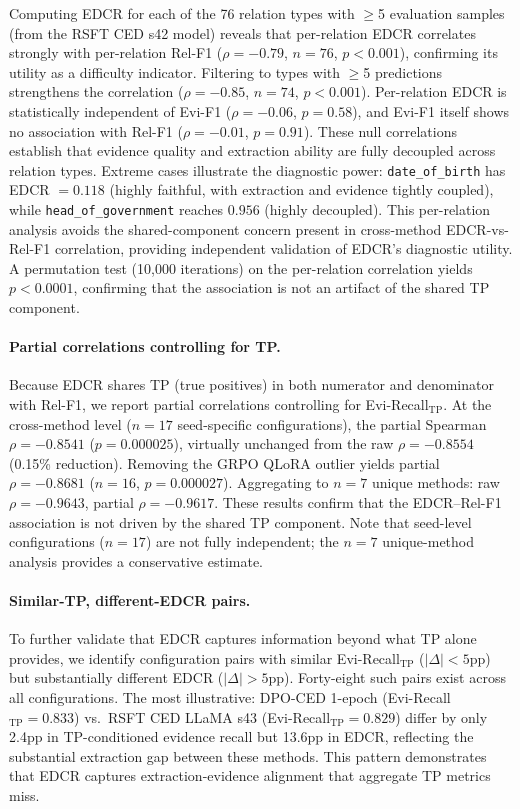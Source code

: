 Computing EDCR for each of the 76 relation types with $\geq$5 evaluation samples (from the RSFT CED s42 model) reveals that per-relation EDCR correlates strongly with per-relation Rel-F1 ($\rho = -0.79$, $n = 76$, $p < 0.001$), confirming its utility as a difficulty indicator. Filtering to types with $\geq$5 predictions strengthens the correlation ($\rho = -0.85$, $n = 74$, $p < 0.001$). Per-relation EDCR is statistically independent of Evi-F1 ($\rho = -0.06$, $p = 0.58$), and Evi-F1 itself shows no association with Rel-F1 ($\rho = -0.01$, $p = 0.91$). These null correlations establish that evidence quality and extraction ability are fully decoupled across relation types. Extreme cases illustrate the diagnostic power: \texttt{date\_of\_birth} has EDCR $= 0.118$ (highly faithful, with extraction and evidence tightly coupled), while \texttt{head\_of\_government} reaches $0.956$ (highly decoupled). This per-relation analysis avoids the shared-component concern present in cross-method EDCR-vs-Rel-F1 correlation, providing independent validation of EDCR's diagnostic utility. A permutation test (10,000 iterations) on the per-relation correlation yields $p < 0.0001$, confirming that the association is not an artifact of the shared TP component.

\paragraph{Partial correlations controlling for TP.}
Because EDCR shares TP (true positives) in both numerator and denominator with Rel-F1, we report partial correlations controlling for Evi-Recall$_\text{TP}$. At the cross-method level ($n = 17$ seed-specific configurations), the partial Spearman $\rho = -0.8541$ ($p = 0.000025$), virtually unchanged from the raw $\rho = -0.8554$ (0.15\% reduction). Removing the GRPO QLoRA outlier yields partial $\rho = -0.8681$ ($n = 16$, $p = 0.000027$). Aggregating to $n = 7$ unique methods: raw $\rho = -0.9643$, partial $\rho = -0.9617$. These results confirm that the EDCR--Rel-F1 association is not driven by the shared TP component. Note that seed-level configurations ($n = 17$) are not fully independent; the $n = 7$ unique-method analysis provides a conservative estimate.

\paragraph{Similar-TP, different-EDCR pairs.}
To further validate that EDCR captures information beyond what TP alone provides, we identify configuration pairs with similar Evi-Recall$_\text{TP}$ ($|\Delta| < 5$pp) but substantially different EDCR ($|\Delta| > 5$pp). Forty-eight such pairs exist across all configurations. The most illustrative: DPO-CED 1-epoch (Evi-Recall$_\text{TP} = 0.833$) vs.\ RSFT CED LLaMA s43 (Evi-Recall$_\text{TP} = 0.829$) differ by only 2.4pp in TP-conditioned evidence recall but 13.6pp in EDCR, reflecting the substantial extraction gap between these methods. This pattern demonstrates that EDCR captures extraction-evidence alignment that aggregate TP metrics miss.

